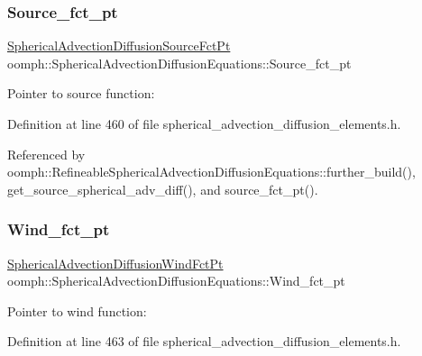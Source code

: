 \subsubsection{\texorpdfstring{Source\+\_\+fct\+\_\+pt}{Source\_fct\_pt}}
{\footnotesize\ttfamily \hyperlink{classoomph_1_1SphericalAdvectionDiffusionEquations_aa02d787c43f88e46ad5e21c7b299b5cb}{Spherical\+Advection\+Diffusion\+Source\+Fct\+Pt} oomph\+::\+Spherical\+Advection\+Diffusion\+Equations\+::\+Source\+\_\+fct\+\_\+pt\hspace{0.3cm}{\ttfamily [protected]}}



Pointer to source function\+: 



Definition at line 460 of file spherical\+\_\+advection\+\_\+diffusion\+\_\+elements.\+h.



Referenced by oomph\+::\+Refineable\+Spherical\+Advection\+Diffusion\+Equations\+::further\+\_\+build(), get\+\_\+source\+\_\+spherical\+\_\+adv\+\_\+diff(), and source\+\_\+fct\+\_\+pt().

\mbox{\label{classoomph_1_1SphericalAdvectionDiffusionEquations_a6a8673efdb4df145804fbb92dccd1835}} 
\subsubsection{\texorpdfstring{Wind\+\_\+fct\+\_\+pt}{Wind\_fct\_pt}}
{\footnotesize\ttfamily \hyperlink{classoomph_1_1SphericalAdvectionDiffusionEquations_adef9c036e9f80c134078d8d78049199e}{Spherical\+Advection\+Diffusion\+Wind\+Fct\+Pt} oomph\+::\+Spherical\+Advection\+Diffusion\+Equations\+::\+Wind\+\_\+fct\+\_\+pt\hspace{0.3cm}{\ttfamily [protected]}}



Pointer to wind function\+: 



Definition at line 463 of file spherical\+\_\+advection\+\_\+diffusion\+\_\+elements.\+h.



